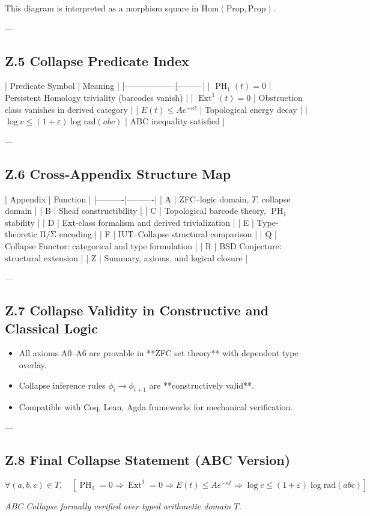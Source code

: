 \documentclass[11pt]{article}
\DeclareMathOperator{\Ext}{Ext}
\DeclareMathOperator{\PH}{PH}
\begin{document}
This diagram is interpreted as a morphism square in \( \mathrm{Hom}(\mathrm{Prop}, \mathrm{Prop}) \).

---

\subsection*{Z.5 Collapse Predicate Index}

| Predicate Symbol | Meaning |
|------------------|---------|
| \( \PH_1(t) = 0 \) | Persistent Homology triviality (barcodes vanish) |
| \( \Ext^1(t) = 0 \) | Obstruction class vanishes in derived category |
| \( E(t) \leq Ae^{-\kappa t} \) | Topological energy decay |
| \( \log c \leq (1+\varepsilon)\log \mathrm{rad}(abc) \) | ABC inequality satisfied |

---

\subsection*{Z.6 Cross-Appendix Structure Map}

| Appendix | Function |
|----------|----------|
| A | ZFC–logic domain, \( T \), collapse domain |
| B | Sheaf constructibility |
| C | Topological barcode theory, \( \PH_1 \) stability |
| D | Ext-class formalism and derived trivialization |
| E | Type-theoretic Π/Σ encoding |
| F | IUT–Collapse structural comparison |
| Q | Collapse Functor: categorical and type formulation |
| R | BSD Conjecture: structural extension |
| Z | Summary, axioms, and logical closure |

---

\subsection*{Z.7 Collapse Validity in Constructive and Classical Logic}

\begin{itemize}
  \item All axioms A0–A6 are provable in **ZFC set theory** with dependent type overlay.
  \item Collapse inference rules \( \phi_i \to \phi_{i+1} \) are **constructively valid**.
  \item Compatible with Coq, Lean, Agda frameworks for mechanical verification.
\end{itemize}

---

\subsection*{Z.8 Final Collapse Statement (ABC Version)}

\[
\forall (a,b,c) \in T,\quad
\left[
  \PH_1 = 0 \Rightarrow \Ext^1 = 0 \Rightarrow E(t) \leq Ae^{-\kappa t} \Rightarrow \log c \leq (1+\varepsilon)\log \mathrm{rad}(abc)
\right]
\]

\begin{center}
\textit{ABC Collapse formally verified over typed arithmetic domain \( T \).}
\end{center}
\end{document}
